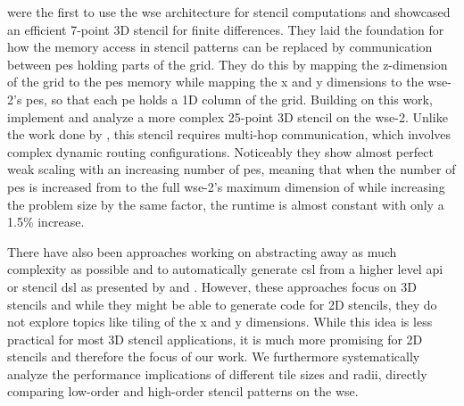 \citeauthor{rocki2020fast} \cite{rocki2020fast} were the first to use the \ac{wse} architecture for stencil computations and showcased an efficient 7-point 3D stencil for finite differences.
They laid the foundation for how the memory access in stencil patterns can be replaced by communication between \acp{pe} holding parts of the grid. They do this by mapping the z-dimension of the grid to the \acp{pe} memory while mapping the x and y dimensions to the \ac{wse}-2's \acp{pe}, so that each \ac{pe} holds a 1D column of the grid.
Building on this work, \citeauthor{jacquelin2022scalable} \cite{jacquelin2022scalable} implement and analyze a more complex 25-point 3D stencil on the \ac{wse}-2. Unlike the work done by \citeauthor{rocki2020fast} \cite{rocki2020fast}, this stencil requires multi-hop communication, which involves complex dynamic routing configurations.
Noticeably they show almost perfect weak scaling with an increasing number of \acp{pe}, meaning that when the number of \acp{pe} is increased from  to the full \ac{wse}-2's maximum dimension of  while increasing the problem size by the same factor, the runtime is almost constant with only a 1.5\% increase.

There have also been approaches working on abstracting away as much complexity as possible and to automatically generate \ac{csl} from a higher level \ac{api} or stencil \ac{dsl} as presented by \citeauthor{woo2022disruptive} \cite{woo2022disruptive} and \citeauthor{sai2024automated} \cite{sai2024automated}. However, these approaches focus on 3D stencils and while they might be able to generate code for 2D stencils, they do not explore topics like tiling of the x and y dimensions. While this idea is less practical for most 3D stencil applications, it is much more promising for 2D stencils and therefore the focus of our work. We furthermore systematically analyze the performance implications of different tile sizes and radii, directly comparing low-order and high-order stencil patterns on the \ac{wse}.